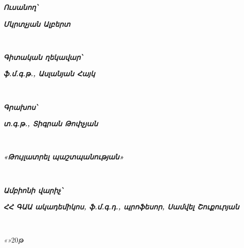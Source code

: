     {
        \linespread{1}
        {
            \large
            \raggedright
            \parbox[t]{2.5cm}{\fontsize{13}{0}\textbf{\textit{Ուսանող՝}}}
            \parbox[t]{0cm}{\underline{\hspace{4cm}} \scriptsize{}} \hfill
            \parbox[t]{9.5cm}{\fontsize{13}{0}\textbf{\textit{Մկրտչյան Ալբերտ}}} \\
        }

        \vspace{2cm}
        {
            \large
            \raggedright
            \parbox[t]{5.2cm}{\fontsize{13}{0}\textbf{\textit{Գիտական ղեկավար՝}}}
            \parbox[t]{0cm}{\underline{\hspace{4cm}} \scriptsize{}} \hfill
            \parbox[t]{6.9cm}{\raggedright\fontsize{13}{0}\textbf{\textit{ֆ.մ.գ.թ., Ասլանյան Հայկ}}} \\
        }

        \vspace{2cm}
        {
            \large
            \raggedright
            \parbox[t]{2.5cm}{\fontsize{13}{0}\textbf{\textit{Գրախոս՝}}}
            \parbox[t]{0cm}{\underline{\hspace{4cm}} \scriptsize{}} \hfill
            \parbox[t]{9.5cm}{\fontsize{13}{0}\textbf{\textit{տ.գ.թ., Տիգրան Թոփչյան}}} \\
        }


        \vfill
        {
            \large
            \raggedright
            \fontsize{13}{0}
            \textbf{\textit{«Թույլատրել պաշտպանության»}}
        } \\

        \vspace{2cm}
        {
            \large
            \raggedright
            \parbox[t]{3.9cm}{\fontsize{13}{0}\textbf{\textit{Ամբիոնի վարիչ՝}}}
            \parbox[t]{2cm}{\underline{\hspace{4cm}} \scriptsize{}} \hfill
            \parbox[t]{8cm}{\raggedright\fontsize{13}{0}\textbf{\textit{ՀՀ ԳԱԱ ակադեմիկոս, ֆ.մ.գ.դ., պրոֆեսոր, Սամվել Շուքուրյան}}} \\
        }

        \vspace{1.5cm}
        {
            \raggedright
            \large
            \textit{«}\underline{\hspace{1.5cm}}\textit{»}\underline{\hspace{2.5cm}}20\underline{\hspace{0.5cm}}\textit{թ} \\
        }

        \newpage
    }